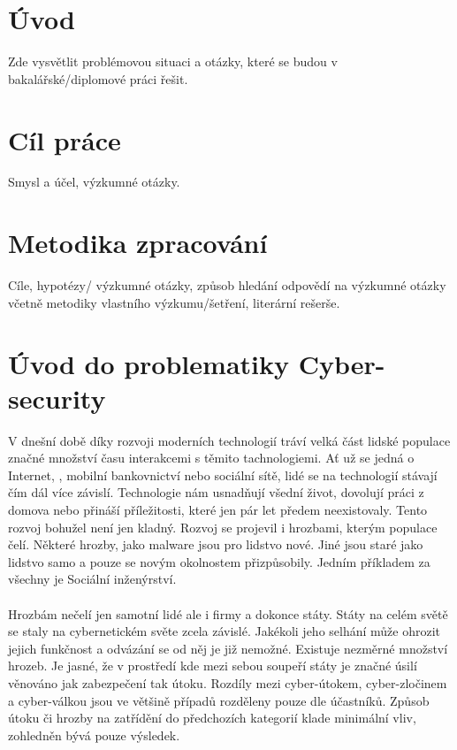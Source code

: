 \section{Úvod}


Zde vysvětlit problémovou situaci a otázky, které se budou v bakalářské/diplomové práci řešit.

\section{Cíl práce}


Smysl a účel, výzkumné otázky.

\section{Metodika zpracování}


Cíle, hypotézy/ výzkumné otázky, způsob hledání odpovědí na výzkumné otázky včetně metodiky vlastního výzkumu/šetření, literární rešerše.

\section{Úvod do problematiky Cyber-security}
V dnešní době díky rozvoji moderních technologií tráví velká část lidské populace značné množství času interakcemi s těmito tachnologiemi.
Ať už se jedná o Internet, , mobilní bankovnictví nebo sociální sítě, lidé se na technologií stávají čím dál více závislí.
Technologie nám usnadňují všední život, dovolují práci z domova nebo přináší příležitosti, které jen pár let předem neexistovaly.
Tento rozvoj bohužel není jen kladný.
Rozvoj se projevil i hrozbami, kterým populace čelí.
Některé hrozby, jako malware jsou pro lidstvo nové.
Jiné jsou staré jako lidstvo samo a pouze se novým okolnostem přizpůsobily.
Jedním příkladem za všechny je Sociální inženýrství.

\paragraph{}
Hrozbám nečelí jen samotní lidé ale i firmy a dokonce státy.
Státy na celém světě se staly na cybernetickém světe zcela závislé.\cite{LI20218176}
Jakékoli jeho selhání může ohrozit jejich funkčnost a odvázání se od něj je již nemožné.
Existuje nezměrné množství hrozeb.
Je jasné, že v prostředí kde mezi sebou soupeří státy je značné úsilí věnováno jak zabezpečení tak útoku.
Rozdíly mezi cyber-útokem, cyber-zločinem a cyber-válkou jsou ve většině případů rozděleny pouze dle účastníků.\cite{LI20218176}
Způsob útoku či hrozby na zatřídění do předchozích kategorií klade minimální vliv, zohledněn bývá pouze výsledek.

